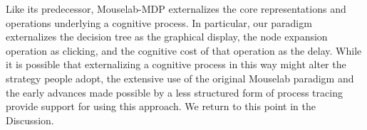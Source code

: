 \label{predecessor}
Like its predecessor, Mouselab-MDP externalizes the core representations and operations underlying a cognitive process. In particular, our paradigm externalizes the decision tree as the graphical display, the node expansion operation as clicking, and the cognitive cost of that operation as the delay. While it is possible that externalizing a cognitive process in this way might alter the strategy people adopt, the extensive use of the original Mouselab paradigm \citep{payne1988adaptive,ford1989process,payne1993adaptive,gabaix2006costly,schulte-mecklenbeck2011visiting} and the early advances made possible by a less structured form of process tracing \citep{degroot1965thought,newell1972human,chase1973perception} provide support for using this approach. We return to this point in the Discussion.



